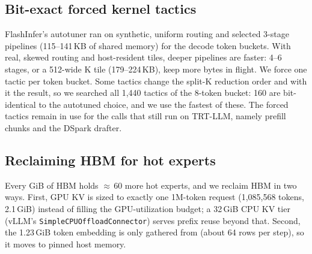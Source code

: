 \documentclass{article}
\begin{document}
\subsection{Bit-exact forced kernel tactics}\label{sec:tactics}
FlashInfer's autotuner ran on synthetic, uniform routing and selected 3-stage pipelines (115--141\,KB of shared memory)
for the decode token buckets. With real, skewed routing and host-resident tiles, deeper pipelines are faster: 4--6
stages, or a 512-wide K tile (179--224\,KB), keep more bytes in flight. We force one tactic per token bucket. Some
tactics change the split-K reduction order and with it the result, so we searched all 1,440 tactics of the 8-token
bucket: 160 are bit-identical to the autotuned choice, and we use the fastest of these. The forced tactics remain in use
for the calls that still run on TRT-LLM, namely prefill chunks and the DSpark drafter.

\subsection{Reclaiming HBM for hot experts}\label{sec:reclaim}
Every GiB of HBM holds ${\approx}\,60$ more hot experts, and we reclaim HBM in two ways. First, GPU KV is sized to
exactly one 1M-token request (1,085,568 tokens, 2.1\,GiB) instead of filling the GPU-utilization budget; a 32\,GiB CPU
KV tier (vLLM's \texttt{SimpleCPUOffloadConnector}) serves prefix reuse beyond that. Second, the 1.23\,GiB token
embedding is only gathered from (about 64 rows per step), so it moves to pinned host memory.
\end{document}
